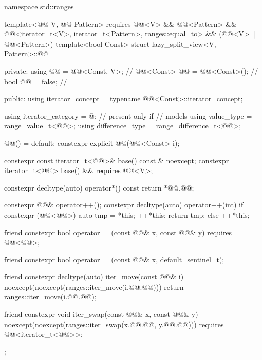 %
\begin{codeblock}
namespace std::ranges {
  template<@@ V, @@ Pattern>
    requires @@<V> && @@<Pattern> &&
             @@<iterator_t<V>, iterator_t<Pattern>, ranges::equal_to> &&
             (@@<V> || @@<Pattern>)
  template<bool Const>
  struct lazy_split_view<V, Pattern>::@@ {
  private:
    using @@ = @@<Const, V>;                     // \expos
    @@<Const> @@ = @@<Const>();     // \expos
    bool @@ = false;                              // \expos

  public:
    using iterator_concept  = typename @@<Const>::iterator_concept;

    using iterator_category = @\seebelownc@;                    // present only if 
                                                            // models 
    using value_type        = range_value_t<@@>;
    using difference_type   = range_difference_t<@@>;

    @@() = default;
    constexpr explicit @@(@@<Const> i);

    constexpr const iterator_t<@@>& base() const & noexcept;
    constexpr iterator_t<@@> base() && requires @@<V>;

    constexpr decltype(auto) operator*() const { return *@@.@@; }

    constexpr @@& operator++();
    constexpr decltype(auto) operator++(int) {
      if constexpr (@@<@@>) {
        auto tmp = *this;
        ++*this;
        return tmp;
      } else
        ++*this;
    }

    friend constexpr bool operator==(const @@& x, const @@& y)
      requires @@<@@>;

    friend constexpr bool operator==(const @@& x, default_sentinel_t);

    friend constexpr decltype(auto) iter_move(const @@& i)
    noexcept(noexcept(ranges::iter_move(i.@@.@@))) {
      return ranges::iter_move(i.@@.@@);
    }

    friend constexpr void iter_swap(const @@& x, const @@& y)
      noexcept(noexcept(ranges::iter_swap(x.@@.@@, y.@@.@@)))
      requires @@<iterator_t<@@>>;
  };
}
\end{codeblock}

